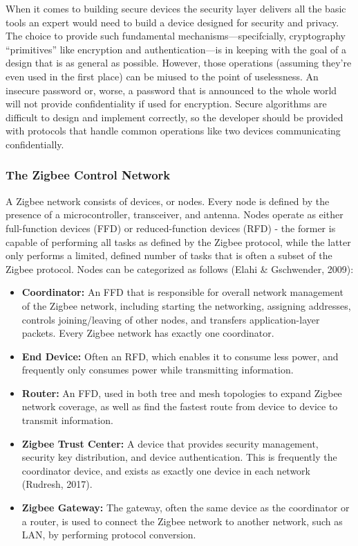 When it comes to building secure devices the security layer delivers all the basic tools an expert would need to build a device designed for security and privacy.
The choice to provide such fundamental mechanisms---specifcially, cryptography ``primitives'' like encryption and authentication---is in keeping with the goal of a design that is as general as possible.
However, those operations (assuming they're even used in the first place) can be miused to the point of uselessness.
An insecure password or, worse, a password that is announced to the whole world will not provide confidentiality if used for encryption.
Secure algorithms are difficult to design and implement correctly, so the developer should be provided with protocols that handle common operations like two devices communicating confidentially.

\subsubsection{The Zigbee Control Network}

A Zigbee network consists of devices, or nodes. Every node is defined by the presence of a microcontroller, transceiver, and antenna. Nodes operate as either full-function devices (FFD) or reduced-function devices (RFD) - the former is capable of performing all tasks as defined by the Zigbee protocol, while the latter only performs a limited, defined number of tasks that is often a subset of the Zigbee protocol. Nodes can be categorized as follows (Elahi \& Gschwender, 2009):

\begin{itemize}
\item {\bf Coordinator:} An FFD that is responsible for overall network management of the Zigbee network, including starting the networking, assigning addresses, controls joining/leaving of other nodes, and transfers application-layer packets. Every Zigbee network has exactly one coordinator.
\item {\bf End Device:} Often an RFD, which enables it to consume less power, and frequently only consumes power while transmitting information.
\item {\bf Router:} An FFD, used in both tree and mesh topologies to expand Zigbee network coverage, as well as find the fastest route from device to device to transmit information.
\item {\bf Zigbee Trust Center:} A device that provides security management, security key distribution, and device authentication. This is frequently the coordinator device, and exists as exactly one device in each network (Rudresh, 2017). 
\item {\bf Zigbee Gateway:} The gateway, often the same device as the coordinator or a router, is used to connect the Zigbee network to another network, such as LAN, by performing protocol conversion.
\end{itemize} 


